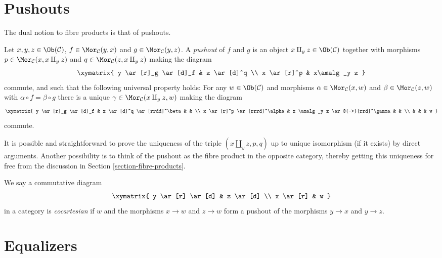 \section{Pushouts}
\label{section-pushouts}

\noindent
The dual notion to fibre products is that of pushouts.

\begin{definition}
\label{definition-pushouts}
Let $x, y, z\in \Ob(\mathcal{C})$,
$f\in \Mor_\mathcal{C}(y, x)$
and $g\in \Mor_{\mathcal C}(y, z)$.
A {\it pushout} of $f$ and $g$ is
an object $x\amalg_y z\in \Ob(\mathcal{C})$
together with morphisms
$p\in \Mor_{\mathcal C}(x, x\amalg_y z)$ and
$q\in\Mor_{\mathcal C}(z, x\amalg_y z)$ making the diagram
$$
\xymatrix{
y \ar[r]_g \ar[d]_f & z \ar[d]^q \\
x \ar[r]^p & x\amalg_y z
}
$$
commute, and such that the following universal property holds:
For any $w\in \Ob(\mathcal{C})$ and morphisms
$\alpha \in \Mor_{\mathcal C}(x, w)$ and
$\beta \in \Mor_\mathcal{C}(z, w)$ with
$\alpha \circ f = \beta \circ g$ there is a unique
$\gamma\in \Mor_{\mathcal C}(x\amalg_y z, w)$ making
the diagram
$$
\xymatrix{
y \ar[r]_g \ar[d]_f & z \ar[d]^q \ar[rrdd]^\beta & & \\
x \ar[r]^p \ar[rrrd]^\alpha & x \amalg_y z  \ar@{-->}[rrd]^\gamma & & \\
& & & w
}
$$
commute.
\end{definition}

\noindent
It is possible and straightforward to prove the uniqueness of the triple
$(x\amalg_y z, p, q)$ up to unique isomorphism (if it exists) by direct
arguments. Another possibility is to think of the pushout as the
fibre product in the opposite category, thereby getting this uniqueness for
free from the discussion in Section \ref{section-fibre-products}.

\begin{definition}
\label{definition-cocartesian}
We say a commutative diagram
$$
\xymatrix{
y \ar[r] \ar[d] & z \ar[d] \\
x \ar[r] & w
}
$$
in a category is {\it cocartesian} if $w$ and the morphisms $x \to w$ and
$z \to w$ form a pushout of the morphisms $y \to x$ and $y \to z$.
\end{definition}


\section{Equalizers}
\label{section-equalizers}

